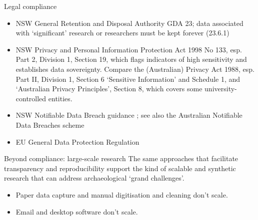 \documentclass[aspectratio=169, 12pt]{beamer} %
\begin{document}
\begin{frame}{Legal compliance}
    \begin{itemize}[label=\textbullet]
        \item NSW General Retention and Disposal Authority GDA 23; data associated with `significant' research or researchers must be kept forever (23.6.1) \cite{Nsw2015-kv}
        \item NSW Privacy and Personal Information Protection Act 1998 No 133, esp. Part 2, Division 1, Section 19, which flags indicators of high sensitivity and establishes data sovereignty.\cite{Nsw1998-mw} Compare the (Australian) Privacy Act 1988, esp. Part II, Division 1, Section 6 `Sensitive Information' and Schedule 1, and `Australian Privacy Principles', Section 8, which covers some university-controlled entities. \cite{Ag2017-oz,Oaic2019-ng}
        \item NSW Notifiable Data Breach guidance \cite{Ipc_nsw2018-yr}; see also the Australian Notifiable Data Breaches scheme \cite{Oaic2019-dq}
        \item EU General Data Protection Regulation \cite{Gdpr2019-ee}
    \end{itemize}
\end{frame}

\begin{frame}{Beyond compliance: large-scale research}
    The same approaches that facilitate transparency and reproducibility support the kind of scalable and synthetic research that can address archaeological `grand challenges'. \cite{Kintigh2014-ub}
        \begin{itemize}[label=\textbullet]
            \item Paper data capture and manual digitisation and cleaning don't scale.
            \item Email and desktop software don't scale.
    \end{itemize}
\end{frame}
\end{document}
